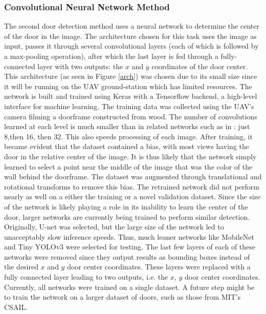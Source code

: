 \documentclass[12pt]{article}
\begin{document}
\subsubsection{Convolutional Neural Network Method}
The second door detection method uses a neural network to determine the center of the door in the image. The architecture chosen for this task uses the image as input, passes it through several convolutional layers (each of which is followed by a max-pooling operation), after which the last layer is fed through a fully-connected layer with two outputs: the $x$ and $y$ coordinates of the door center. This architecture (as seen in Figure \ref{arch}) was chosen due to its small size since it will be running on the UAV ground-station which has limited resources. The network is built and trained using Keras with a Tensorflow backend, a high-level interface for machine learning. The training data was collected using the UAV's camera filming a doorframe constructed from wood. The number of convolutions learned at each level is much smaller than in related networks such as in \cite{NNDoor}: just 8,then 16, then 32. This also speeds processing of each image. After training, it became evident that the dataset contained a bias, with most views having the door in the relative center of the image. It is thus likely that the network simply learned to select a point near the middle of the image that was the color of the wall behind the doorframe. The dataset was augmented through translational and rotational transforms to remove this bias. The retrained network did not perform nearly as well on a either the training or a novel validation dataset. Since the size of the network is likely playing a role in its inability to learn the center of the door, larger networks are currently being trained to perform similar detection. Originally, U-net \cite{Unet} was selected, but the large size of the network led to unacceptably slow inference speeds. Thus, much leaner networks like MobileNet \cite{howard2017mobilenets} and Tiny YOLOv3 \cite{yolov3} were selected for testing. The last few layers of each of these networks were removed since they output results as bounding boxes instead of the desired $x$ and $y$ door center coordinates. These layers were replaced with a fully connected layer leading to two outputs, i.e. the $x$, $y$ door center coordinates. Currently, all networks were trained on a single dataset. A future step might be to train the network on a larger dataset of doors, such as those from MIT's CSAIL\cite{csail_data_2}\cite{csail_data_1}.
\end{document}
